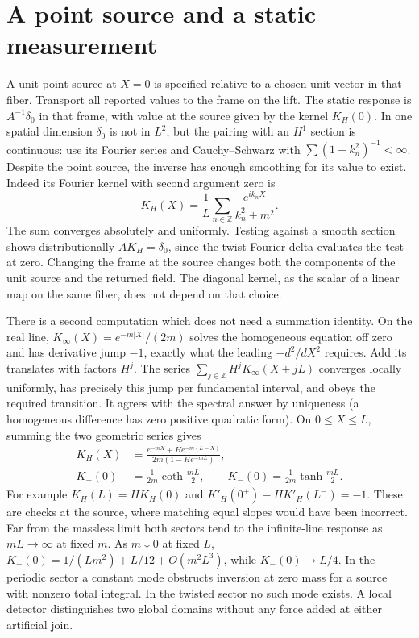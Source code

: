 \section{A point source and a static measurement}\label{f:static-circle}
A unit point source at $X=0$ is specified relative to a chosen unit vector in that fiber. Transport all reported values to the frame on the lift. The static response is $A^{-1}\delta_0$ in that frame, with value at the source given by the kernel $K_H(0)$. In one spatial dimension $\delta_0$ is not in $L^2$, but the pairing with an $H^1$ section is continuous: use its Fourier series and Cauchy--Schwarz with $\sum(1+k_n^2)^{-1}<\infty$. Despite the point source, the inverse has enough smoothing for its value to exist. Indeed its Fourier kernel with second argument zero is
\[
 K_H(X)=\frac1L\sum_{n\in\mathbb Z}\frac{e^{ik_n X}}{k_n^2+m^2} .
\]
The sum converges absolutely and uniformly. Testing against a smooth section shows distributionally $AK_H=\delta_0$, since the twist-Fourier delta evaluates the test at zero. Changing the frame at the source changes both the components of the unit source and the returned field. The diagonal kernel, as the scalar of a linear map on the same fiber, does not depend on that choice.

There is a second computation which does not need a summation identity. On the real line, $K_\infty(X)=e^{-m|X|}/(2m)$ solves the homogeneous equation off zero and has derivative jump $-1$, exactly what the leading $-d^2/dX^2$ requires. Add its translates with factors $H^j$. The series $\sum_{j\in\mathbb Z}H^j K_\infty(X+jL)$ converges locally uniformly, has precisely this jump per fundamental interval, and obeys the required transition. It agrees with the spectral answer by uniqueness (a homogeneous difference has zero positive quadratic form). On $0\le X\le L$, summing the two geometric series gives
\begin{align}
 K_H(X)&=\frac{e^{-mX}+H e^{-m(L-X)}}{2m(1-He^{-mL})},\nonumber\\
 K_+(0)&=\frac{1}{2m}\coth\frac{mL}{2},\qquad
 K_-(0)=\frac{1}{2m}\tanh\frac{mL}{2}.\label{f:static-measurement}
\end{align}
For example $K_H(L)=H K_H(0)$ and $K'_H(0^+)-H K'_H(L^-)=-1$. These are checks at the source, where matching equal slopes would have been incorrect. Far from the massless limit both sectors tend to the infinite-line response as $mL\to\infty$ at fixed $m$. As $m\downarrow0$ at fixed $L$, $K_+(0)=1/(Lm^2)+L/12+O(m^2L^3)$, while $K_-(0)\to L/4$. In the periodic sector a constant mode obstructs inversion at zero mass for a source with nonzero total integral. In the twisted sector no such mode exists. A local detector distinguishes two global domains without any force added at either artificial join.

